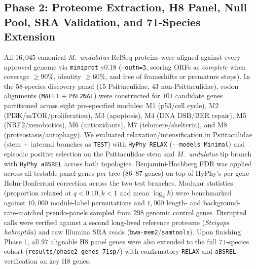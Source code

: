\documentclass[10pt,a4paper,twocolumn]{article}
\begin{document}
\subsection{Phase 2: Proteome Extraction, H8 Panel, Null Pool, SRA Validation, and 71-Species Extension}
All $16,045$ canonical \textit{M.\ undulatus} RefSeq proteins were aligned against every approved genome via \texttt{miniprot} v0.18 (\texttt{-outn=3}, scoring ORFs as \textit{complete} when coverage $\ge 90\%$, identity $\ge 60\%$, and free of frameshifts or premature stops). In the $58$-species discovery panel ($15$ Psittaculidae, $43$ non-Psittaculidae), codon alignments (\texttt{MAFFT} + \texttt{PAL2NAL}) were constructed for $101$ candidate genes partitioned across eight pre-specified modules: M1 (p53/cell cycle), M2 (PI3K/mTOR/proliferation), M3 (apoptosis), M4 (DNA DSB/BER repair), M5 (NRF2/xenobiotics), M6 (antioxidants), M7 (telomere/shelterin), and M8 (proteostasis/autophagy). We evaluated relaxation/intensification in Psittaculidae (stem + internal branches as \texttt{TEST}) with \texttt{HyPhy RELAX} (\texttt{-{}-models Minimal}) and episodic positive selection on the Psittaculidae stem and \textit{M.\ undulatus} tip branch with \texttt{HyPhy aBSREL} across both topologies. Benjamini-Hochberg FDR was applied across all testable panel genes per tree ($86$--$87$ genes) on top of HyPhy's per-gene Holm-Bonferroni correction across the two test branches. Modular statistics (proportion relaxed at $q < 0.10, k < 1$ and mean $\log_2 k$) were benchmarked against $10,000$ module-label permutations and $1,000$ length- and background-rate-matched pseudo-panels sampled from $298$ genomic control genes. Disrupted calls were verified against a second long-lived reference proteome (\textit{Strigops habroptila}) and raw Illumina SRA reads (\texttt{bwa-mem2}/\texttt{samtools}). Upon finishing Phase 1, all $97$ alignable H8 panel genes were also extended to the full $71$-species cohort (\texttt{results/phase2\_genes\_71sp/}) with confirmatory \texttt{RELAX} and \texttt{aBSREL} verification on key H8 genes.
\end{document}

